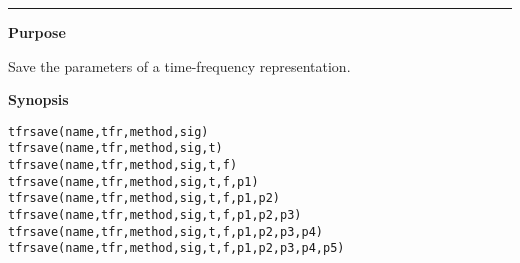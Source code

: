 


\hspace*{-1.6cm}{\Large \bf tfrsave}

\vspace*{-.4cm}
\hspace*{-1.6cm}\rule[0in]{16.5cm}{.02cm}
\vspace*{.2cm}

{\bf \large {}\selectfont Purpose}\\
\hspace*{1.5cm}
\begin{minipage}[t]{13.5cm}
Save the parameters of a time-frequency representation.
\end{minipage}
\vspace*{.3cm}

{\bf \large {}\selectfont Synopsis}\\
\hspace*{1.5cm}
\begin{minipage}[t]{13.5cm}
\begin{verbatim}
tfrsave(name,tfr,method,sig)
tfrsave(name,tfr,method,sig,t)
tfrsave(name,tfr,method,sig,t,f)
tfrsave(name,tfr,method,sig,t,f,p1)
tfrsave(name,tfr,method,sig,t,f,p1,p2)
tfrsave(name,tfr,method,sig,t,f,p1,p2,p3)
tfrsave(name,tfr,method,sig,t,f,p1,p2,p3,p4)
tfrsave(name,tfr,method,sig,t,f,p1,p2,p3,p4,p5)
\end{verbatim}
\end{minipage}
\vspace*{.4cm}

